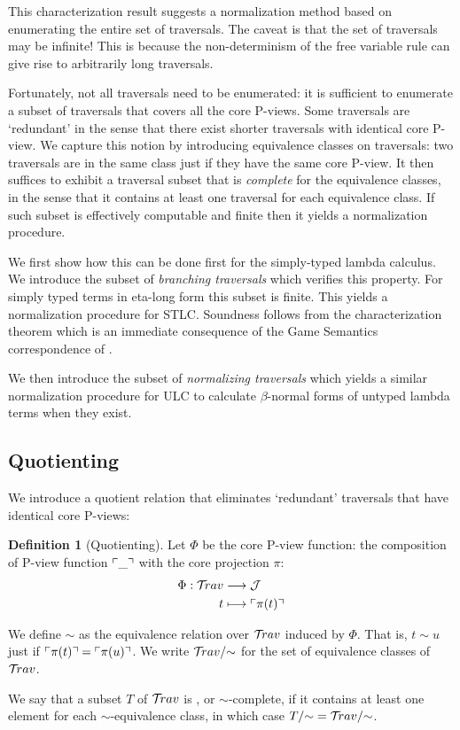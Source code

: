 \documentclass{article}
\theoremstyle{definition}
\newtheorem{definition}{Definition}[section]
\newcommand{\travulc}{\travset}
\def\coresymbol{\pi} %
\newcommand{\core}[1]{\coresymbol(#1)} %
\def\justseqset{\mathcal{J}}
\begin{document}
This characterization result suggests a normalization method based on enumerating the entire set of traversals. The caveat is that the set of traversals may be infinite! This is because the non-determinism of the free variable rule can give rise to arbitrarily long traversals.

Fortunately, not all traversals need to be enumerated: it is sufficient to enumerate a subset of traversals that covers all the core P-views. Some traversals are `redundant' in the sense that there exist shorter traversals with identical core P-view. We capture this notion by introducing equivalence classes on traversals: two traversals are in the same class just if they have the same core P-view. It then suffices to exhibit a traversal subset that is \emph{complete} for the equivalence classes, in the sense that it contains at least one traversal for each equivalence class. If such subset is effectively computable and finite then it yields a normalization procedure.

We first show how this can be done first for the simply-typed lambda calculus. We introduce the subset of \emph{branching traversals} which verifies this property. For simply typed terms in eta-long form this subset is finite. This yields a normalization procedure for STLC.
Soundness follows from the characterization theorem which is an immediate consequence of the Game Semantics correspondence of \cite{BlumPhd}.

We then introduce the subset of \emph{normalizing traversals} which yields a similar normalization procedure for ULC to calculate $\beta$-normal forms of untyped lambda terms when they exist.

\subsection{Quotienting}

We introduce a quotient relation that eliminates `redundant' traversals that have identical core P-views: \begin{definition}[Quotienting]
Let $\Phi$ be the core P-view function: the composition of P-view function $\ulcorner \_ \urcorner$ with the core projection $\coresymbol$:
\begin{align*}
\Phi : \travulc & \longrightarrow \justseqset \\
t & \longmapsto \pview{\core{t}}
\end{align*}

We define $\sim$ as the equivalence relation over $\travulc$ induced by $\Phi$. That is, $t \sim u$ just if $\pview{\core{t}} = \pview{\core{u}}$. We write $\travulc/{\sim}$ for the set of equivalence classes of $\travulc$.

We say that a subset $T$ of $\travulc$ is , or $\sim$-complete, if it contains at least one element for each $\sim$-equivalence class, in which case $T/{\sim} = \travulc/{\sim}$.
\end{definition}
\end{document}
